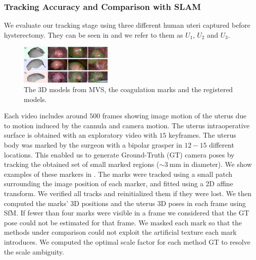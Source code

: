 \subsubsection{Tracking Accuracy and Comparison with SLAM}
We evaluate our tracking stage using three different human uteri captured before hysterectomy. They can be seen in  and we refer to them as $U_1$, $U_2$ and $U_3$.
\begin{figure}[htb]
  \centering
  \includegraphics[width=0.4\textwidth]{./figs/snapshotsCompressed.pdf}
\caption{The 3D models from MVS, the coagulation marks and the registered models.}
\label{fig:hister}
\end{figure}
Each video includes around $500$ frames showing image motion of the uterus due to motion induced by the cannula and camera motion. The uterus intraoperative surface is obtained with an exploratory video with $15$ keyframes. 
The uterus body was marked by the surgeon with a bipolar grasper in $12-15$ different locations.
This enabled us to generate Ground-Truth (GT) camera poses by tracking the obtained set of small marked regions ($\sim\SI{3}{\milli\metre}$ in diameter).
We show examples of these markers in . 
The marks were tracked using a small patch surrounding the image position of each marker, and fitted using a 2D affine transform. 
We verified all tracks and reinitialized them if they were lost. We then computed the marks' 3D positions and the uterus 3D poses in each frame using SfM. 
If fewer than four marks were visible in a frame we considered that the GT pose could not be estimated for that frame. 
We masked each mark so that the methods under comparison could not exploit the artificial texture each mark introduces. 
We computed the optimal scale factor for each method \wrt GT to resolve the scale ambiguity.
